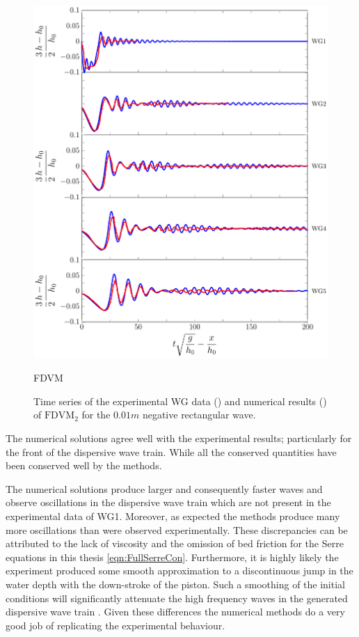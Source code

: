 \begin{figure}
	\centering
	\includegraphics[width=\textwidth]{./chp6/figures/Experiment/Segur/LongWGsFDVM1cm.pdf}
	\caption{FDVM}
	\caption{Time series of the experimental WG data ({\color{red}\solidrule}) and numerical results ({\color{blue}\solidrule}) of $\text{FDVM}_2$ for the $0.01m$ negative rectangular wave.}
	\label{fig:Segur1cmFDVM}
\end{figure} 

The numerical solutions agree well with the experimental results; particularly for the front of the dispersive wave train. While all the conserved quantities have been conserved well by the methods.  

The numerical solutions produce larger and consequently faster waves and observe oscillations in the dispersive wave train which are not present in the experimental data of WG1. Moreover, as expected the methods produce many more oscillations than were observed experimentally. These discrepancies can be attributed to the lack of viscosity and the omission of bed friction for the Serre equations in this thesis \eqref{eqn:FullSerreCon}. Furthermore, it is highly likely the experiment produced some smooth approximation to a discontinuous jump in the water depth with the down-stroke of the piston. Such a smoothing of the initial conditions will significantly attenuate the high frequency waves in the generated dispersive wave train \cite{Pitt-2018-61}. Given these differences the numerical methods do a very good job of replicating the experimental behaviour.

